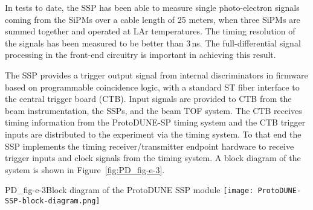 In tests to date, the SSP has been able to measure single photo-electron signals 
coming from the SiPMs over a cable length of 25 meters, when three SiPMs 
are summed together and operated at LAr temperatures.  
The timing resolution of the signals has been measured to be better than 3\,ns.  
The full-differential signal processing in the front-end circuitry 
is important in achieving this result.

The SSP provides a trigger output signal from internal discriminators in firmware based on programmable
coincidence logic, with a standard ST fiber interface to the central trigger board (CTB).
Input signals are provided to CTB from the beam instrumentation, the SSPs, and the beam TOF system.
The CTB receives timing information from the ProtoDUNE-SP timing system and the CTB trigger inputs are distributed to 
the experiment via the timing system.
To that end the SSP implements the timing receiver/transmitter endpoint hardware to receive trigger inputs and clock signals from the timing system.
A block diagram of the system is shown in Figure~\ref{fig:PD_fig-e-3}.
%
\begin{cdrfigure}{PD_fig-e-3}{Block diagram of the ProtoDUNE SSP module} 
\texttt{[image: ProtoDUNE-SSP-block-diagram.png]}
\end{cdrfigure}
